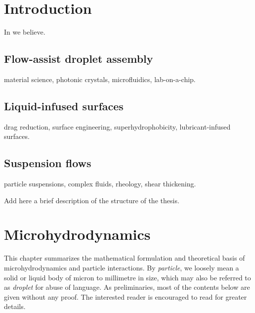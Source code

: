 \graphicspath{{imgs/}}

\chapter{Introduction}



In \cite{Batchelor} we believe.



\section{Flow-assist droplet assembly}

material science,
photonic crystals,
microfluidics,
lab-on-a-chip.


\section{Liquid-infused surfaces}

drag reduction,
surface engineering,
superhydrophobicity,
lubricant-infused surfaces.


\section{Suspension flows}

particle suspensions,
complex fluids,
rheology,
shear thickening.

\thesisstructure Add here a brief description of the structure of the thesis.



\chapter{Microhydrodynamics}


This chapter summarizes the mathematical formulation and theoretical basis of microhydrodynamics and particle interactions.
By \emph{particle}, we loosely mean a solid or liquid body of micron to millimetre in size, which may also be referred to as \emph{droplet} for abuse of language.
As preliminaries, most of the contents below are given without any proof. The interested reader is encouraged to read \cite{Batchelor, hb, ps, kim_karrila, graham_2018} for greater details.

